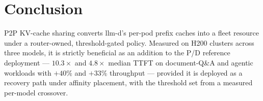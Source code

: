 \documentclass[twocolumn,10pt]{article}
\newcommand{\llmd}{llm-d}
\begin{document}
\section{Conclusion}
P2P KV-cache sharing converts \llmd{}'s per-pod prefix caches into a
fleet resource under a router-owned, threshold-gated policy. Measured
on H200 clusters across three models, it is strictly beneficial as an
addition to the P/D reference deployment --- $10.3\times$ and
$4.8\times$ median TTFT on document-Q\&A and agentic workloads with
$+40\%$ and $+33\%$ throughput --- provided it is deployed as a recovery
path under affinity placement, with the threshold set from a measured
per-model crossover.
\end{document}

